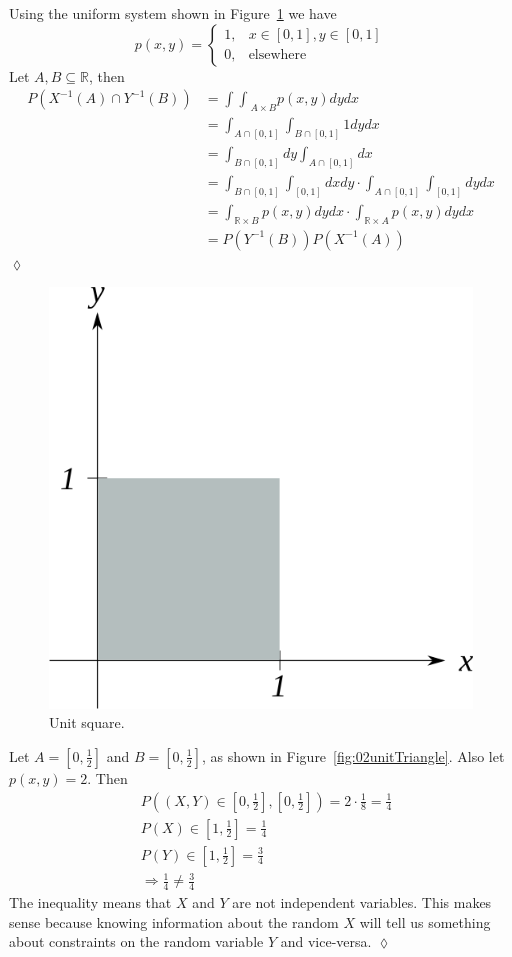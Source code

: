 \begin{example}
Using the uniform system shown in Figure~\ref{fig:02unitSquare} we have
$$p(x,y) = \begin{cases} 1, & x\in[0,1],y\in[0,1] \\ 0, & \text{elsewhere} \end{cases}$$
Let $A,B\subseteq\mathbb{R}$, then
\begin{align*}
P(X^{-1}(A) \cap Y^{-1}(B)) &= {\int\int}_{A\times B} p(x,y)dydx \\
&= \int_{A\cap[0,1]}\int_{B\cap[0,1]} 1 dydx \\
&= \int_{B\cap[0,1]}dy \int_{A\cap[0,1]}dx \\
&= \int_{B\cap[0,1]}\int_{[0,1]}dxdy \cdot \int_{A\cap[0,1]}\int_{[0,1]}dydx \\
&= \int_{\mathbb{R}\times B}p(x,y)dydx \cdot \int_{\mathbb{R}\times A}p(x,y)dydx \\
&= P(Y^{-1}(B)) P(X^{-1}(A))
\end{align*}
$\lozenge$
\end{example}

\begin{figure}[ht!]
\centering
\includegraphics[width=.3\textwidth]{images/02unitSquare}
\caption{Unit square.}
\label{fig:02unitSquare}
\end{figure}

\begin{example}
Let $A=[0,\frac{1}{2}]$ and $B=[0,\frac{1}{2}]$, as shown in Figure~\ref{fig:02unitTriangle}.
Also let $p(x,y)=2$.
Then
\begin{align*}
&P((X,Y)\in [0,\frac{1}{2}],[0,\frac{1}{2}]) = 2\cdot \frac{1}{8} = \frac{1}{4} \\
&P(X)\in[1,\frac{1}{2}] = \frac{1}{4} \\
&P(Y)\in[1,\frac{1}{2}] = \frac{3}{4} \\
&\Rightarrow \frac{1}{4} \neq \frac{3}{4}
\end{align*}
The inequality means that $X$ and $Y$ are not independent variables.
This makes sense because knowing information about the random $X$ will tell us something about constraints on the random variable $Y$ and vice-versa.
$\lozenge$
\end{example}

